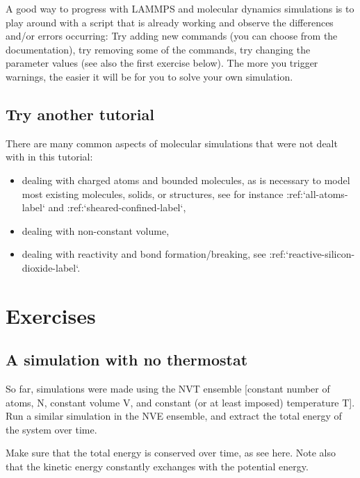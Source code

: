 \noindent A good way to progress with LAMMPS and molecular dynamics
simulations is to play around with a script that is already
working and observe the differences and/or errors occurring:
Try adding new commands (you can choose from the documentation),
try removing some of the commands, try changing the parameter values
(see also the first exercise below).
The more you trigger warnings, the easier it will be for you to solve your
own simulation.

\subsection{Try another tutorial}

\noindent There are many common aspects of molecular simulations that were not dealt with in this
tutorial:
\begin{itemize}
\item dealing with charged atoms and bounded molecules, as is necessary to model most existing molecules, solids, or structures, see for instance :ref:`all-atoms-label` and :ref:`sheared-confined-label`,
\item dealing with non-constant volume,
\item dealing with reactivity and bond formation/breaking, see :ref:`reactive-silicon-dioxide-label`.
\end{itemize}

\section{Exercises}

\noindent \subsection{A simulation with no thermostat}

So far, simulations were made using the NVT ensemble [constant number 
of atoms, N, constant volume V, and constant (or at least imposed)
temperature T].
Run a similar simulation in the NVE ensemble, and extract the
total energy of the system over time.

\begin{tcolorbox}[colback=mylightblue!5!white,colframe=mylightblue!75!black,title=Expected output]
Make sure that the total energy is conserved over time, as see here. Note also 
that the kinetic energy constantly exchanges with the potential energy.
\end{tcolorbox}

